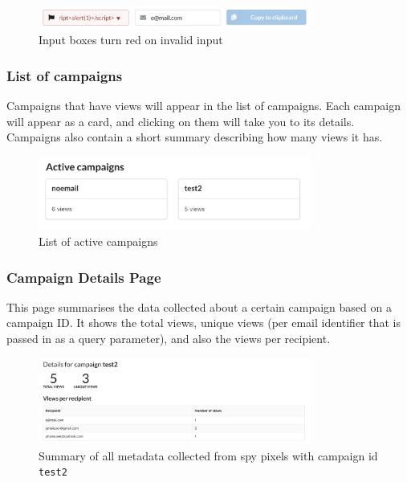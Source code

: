 \documentclass{article}
\begin{document}
\begin{figure}[H]
\centering
\includegraphics[width=0.8\textwidth]{images/xss-block.png}
\caption{Input boxes turn red on invalid input}
\end{figure}

\subsubsection{List of campaigns}

Campaigns that have views will appear in the list of campaigns. Each campaign will appear as a card, and clicking on them will take you to its details. Campaigns also contain a short summary describing how many views it has.

\begin{figure}[H]
\centering
\includegraphics[width=0.8\textwidth]{images/active-campaigns.png}
\caption{List of active campaigns}
\end{figure}

\subsubsection{Campaign Details Page}

This page summarises the data collected about a certain campaign based on a campaign ID. It shows the total views, unique views (per email identifier that is passed in as a query parameter), and also the views per recipient.

\begin{figure}[H]
\centering
\includegraphics[width=0.8\textwidth]{images/summary-campaign.png}
\caption{Summary of all metadata collected from spy pixels with campaign id \texttt{test2}}
\end{figure}
\end{document}
